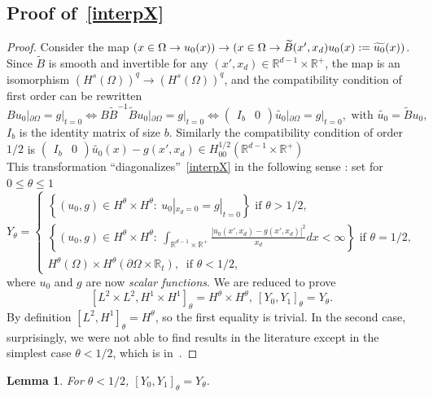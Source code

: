 \documentclass[10pt]{amsart}
\newtheorem{lemm}[theo]{Lemma}\newtheorem{prop}[theo]{Proposition}\newtheorem{coro}[theo]{Corollary}\newtheorem{conj}[theo]{Conjecture}
\theoremstyle{definition}\newtheorem{defi}[theo]{Definition}\newtheorem{rema}[theo]{Remark}\newtheorem{exam}[theo]{Example}\newtheorem{exem}[theo]{Example}\newtheorem{nota}[theo]{Notation}
\newcommand{\R}{\mathbb{R}}
\newcommand{\di}{\displaystyle}
\begin{document}
\subsection{Proof of~\eqref{interpX}}
\begin{proof}
Consider the map $(x\in \Omega\to u_0(x))\to (x\in \Omega\to
\widetilde{B}(x',x_d)u_0(x)\linebreak :=\widetilde{u_0}(x))$. Since $\widetilde{B}$ is smooth and invertible for any $(x',x_d)\in \R^{d-1}\times \R^+$, the map is an isomorphism $(H^s(\Omega))^q\to (H^s(\Omega))^q$, and the compatibility condition of first order can be rewritten
\[
Bu_0|_{\partial\Omega}=g|_{t=0}
\Leftrightarrow B\widetilde{B}^{-1}
\widetilde{B}u_0|_{\partial\Omega} =g|_{t=0}\Leftrightarrow
\begin{pmatrix}
I_b & 0
\end{pmatrix}
\widetilde{u_0}|_{\partial\Omega} =g|_{t=0},\text{ with }\widetilde{u_0}=\widetilde{B}u_0,
\]
$I_b$ is the identity matrix of size $b$. Similarly the compatibility condition of order $1/2$ is $
(\begin{smallmatrix}
I_b & 0
\end{smallmatrix})\widetilde{u_0}(x)-g(x',x_d)\in H^{1/2}_{00}(\R^{d-1}\times \R^+)$\\
This transformation ``diagonalizes''~\eqref{interpX} in the following sense : set for $0\leq \theta\leq 1$
\[
Y_\theta=
\left\{
\begin{array}{ll}
\di \left\{(u_0,g)\in H^\theta\times H^\theta:\ u_0|_{x_d=0}=g|_{t=0}\right\}\text{ if }\theta >1/2,
\\
\di \left\{(u_0,g)\in H^\theta\times H^\theta:\
\int_{\R^{d-1}\times \R^+}\frac{\left|u_0(x',x_d)-g(x',x_d)\right|^2}{x_d}dx<\infty\right\}\text{ if }\theta =1/2,\\
\di H^\theta(\Omega)\times H^\theta(\partial\Omega\times \R_t),\ \text{ if }\theta <1/2,
\end{array}\right.
\]
where $u_0$ and $g$ are now \emph{scalar functions}. We are reduced to prove
\[
\left[L^2\times L^2,H^1\times H^1\right]_\theta=H^\theta\times H^\theta,\ [Y_0,Y_1]_\theta=Y_\theta.
\]
By definition $[L^2,H^1]_\theta=H^\theta$, so the first equality is trivial. In the second case, surprisingly, we were not able to find results in the literature except in the simplest case $\theta<1/2$, which is in~\cite[Section~14]{lionsmagenes2}.
\end{proof}

\begin{lemm}\label{interpfacile}
For $\theta<1/2$, $[Y_0,Y_1]_\theta=Y_\theta$.
\end{lemm}
\end{document}
